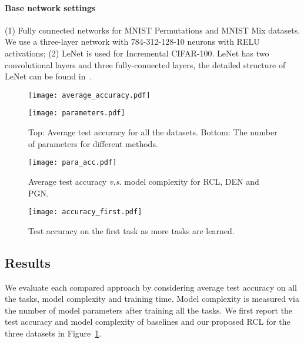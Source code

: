 \documentclass{article}
\begin{document}
\paragraph{Base network settings}
(1) Fully con{}nected networks for  MNIST Permutations and MNIST Mix datasets. We use a three-layer network with 784-312-128-10 neurons with RELU activations;
(2) LeNet is used for Incremental CIFAR-100. LeNet has two convolutional layers and three fully-connected layers, the detailed structure of {}LeNet can be found in~\cite{lenet1}.





\begin{figure}[htbp]
  \centering
    \begin{minipage}[b]{0.85\textwidth}
      \texttt{[image: average\_accuracy.pdf]}
    \end{minipage}
      \begin{minipage}[b]{0.85\textwidth}
    \texttt{[image: parameters.pdf]}
  \end{minipage}
  \caption{Top: Average test accuracy for all the datasets. Bottom: The number of parameters  for different methods. } \label{experiments}
\end{figure}



\begin{figure}[htbp]
  \texttt{[image: para\_acc.pdf]}
  \vspace{-0.5cm}
  \caption{Average test accuracy \emph{v.s.} model complexity for RCL, DEN and PGN.}
  \label{fig:accvspara}
\end{figure}

\begin{figure}[htbp]
  \centering
      \texttt{[image: accuracy\_first.pdf]}
      \vspace{-0.5cm}
  \caption{Test accuracy on the first task as more tasks are learned.} \label{fig:forgetting}
\end{figure}





\subsection{Results}
We evaluate each compared approach by considering  average test accuracy on all the tasks, model complexity and training time. Model complexity is measured via the number of model parameters after training all the tasks. We first report the test accuracy and model complexity of baselines and our proposed RCL for the three datasets in Figure~\ref{experiments}.
\end{document}
